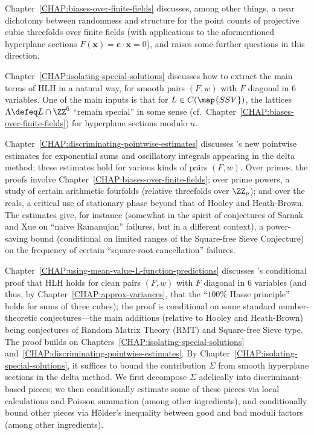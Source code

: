 \documentclass[12pt]{report}
\begin{document}
Chapter~\ref{CHAP:biases-over-finite-fields} discusses, among other things, a near dichotomy between randomness and structure for the point counts of projective cubic threefolds over finite fields (with applications to the aformentioned hyperplane sections $F(\bm{x}) = \bm{c}\cdot\bm{x} = 0$), and raises some further questions in this direction.

Chapter~\ref{CHAP:isolating-special-solutions} discusses how to extract the main terms of HLH in a natural way, for smooth pairs $(F,w)$ with $F$ diagonal in $6$ variables.
One of the main inputs is that for $L\in C(\map{SSV})$, the lattices $\Lambda\defeq L\cap \ZZ^6$ ``remain special'' in some sense (cf.~Chapter~\ref{CHAP:biases-over-finite-fields}) for hyperplane sections modulo $n$.

Chapter~\ref{CHAP:discriminating-pointwise-estimates} discusses \cite{wang2021_HLH_vs_RMT}'s new pointwise estimates for exponential sums and oscillatory integrals appearing in the delta method;
these estimates hold for various kinds of pairs $(F,w)$.
Over primes, the proofs involve Chapter~\ref{CHAP:biases-over-finite-fields};
over prime powers, a study of certain arithmetic fourfolds (relative threefolds over $\ZZ_p$);
and over the reals, a critical use of stationary phase beyond that of Hooley and Heath-Brown.
The estimates give, for instance (somewhat in the spirit of conjectures of Sarnak and Xue on ``naive Ramanujan'' failures, but in a different context), a power-saving bound (conditional on limited ranges of the Square-free Sieve Conjecture) on the frequency of certain ``square-root cancellation'' failures.

Chapter~\ref{CHAP:using-mean-value-L-function-predictions} discusses \cite{wang2021_HLH_vs_RMT}'s conditional proof that HLH holds for clean pairs $(F,w)$ with $F$ diagonal in $6$ variables (and thus, by Chapter~\ref{CHAP:approx-variances}, that the ``$100\%$ Hasse principle'' holds for sums of three cubes);
the proof is conditional on some standard number-theoretic conjectures---the main additions (relative to Hooley and Heath-Brown) being conjectures of Random Matrix Theory (RMT) and Square-free Sieve type.
The proof builds on Chapters~\ref{CHAP:isolating-special-solutions} and~\ref{CHAP:discriminating-pointwise-estimates}.
By Chapter~\ref{CHAP:isolating-special-solutions}, it suffices to bound the contribution $\Sigma$ from smooth hyperplane sections in the delta method.
We first decompose $\Sigma$ adelically into discriminant-based pieces;
we then conditionally estimate some of these pieces via local calculations and Poisson summation (among other ingredients),
and conditionally bound other pieces via H\"{o}lder's inequality between good and bad moduli factors (among other ingredients).
\end{document}
